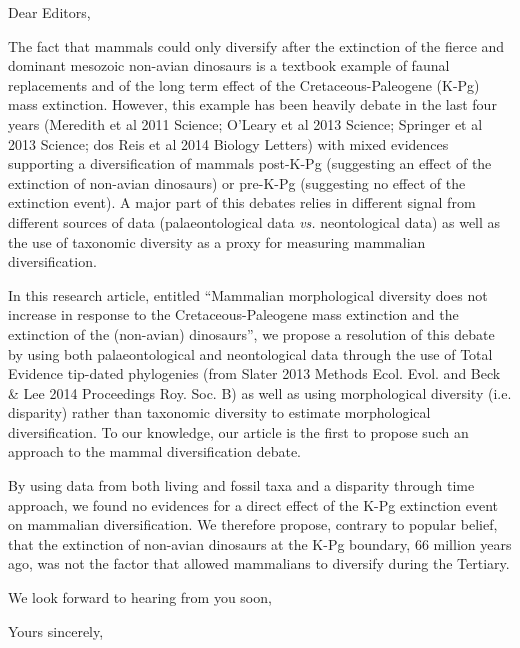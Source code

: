 \documentclass[11pt]{letter}
\begin{document}
\begin{letter}{}
\opening{Dear Editors,}

The fact that mammals could only diversify after the extinction of the fierce and dominant mesozoic non-avian dinosaurs is a textbook example of faunal replacements and of the long term effect of the Cretaceous-Paleogene (K-Pg) mass extinction.
However, this example has been heavily debate in the last four years (Meredith et al 2011 Science; O'Leary et al 2013 Science; Springer et al 2013 Science; dos Reis et al 2014 Biology Letters) with mixed evidences supporting a diversification of mammals post-K-Pg (suggesting an effect of the extinction of non-avian dinosaurs) or pre-K-Pg (suggesting no effect of the extinction event).
A major part of this debates relies in different signal from different sources of data (palaeontological data \textit{vs.} neontological data) as well as the use of taxonomic diversity as a proxy for measuring mammalian diversification.

In this research article, entitled ``Mammalian morphological diversity does not increase in response to the Cretaceous-Paleogene mass extinction and the extinction of the (non-avian) dinosaurs'', we propose a resolution of this debate by using both palaeontological and neontological data through the use of Total Evidence tip-dated phylogenies (from Slater 2013 Methods Ecol. Evol. and Beck \& Lee 2014 Proceedings Roy. Soc. B) as well as using morphological diversity (i.e. disparity) rather than taxonomic diversity to estimate morphological diversification.
To our knowledge, our article is the first to propose such an approach to the mammal diversification debate.

By using data from both living and fossil taxa and a disparity through time approach, we found no evidences for a direct effect of the K-Pg extinction event on mammalian diversification.
We therefore propose, contrary to popular belief, that the extinction of non-avian dinosaurs at the K-Pg boundary, 66 million years ago, was not the factor that allowed mammalians to diversify during the Tertiary.

We look forward to hearing from you soon,

\closing{Yours sincerely,}

\end{letter}
\end{document}
